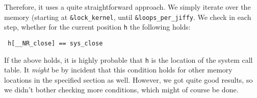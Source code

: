 \documentclass[10pt, letterpaper]{scrartcl}
\begin{document}
Therefore, it uses a quite straightforward approach. We simply iterate over the memory (starting at \texttt{\&lock\_kernel}, until \texttt{\&loops\_per\_jiffy}. We check in each step, whether for the current position \texttt{h} the following holds:

\begin{verbatim}
 h[__NR_close] == sys_close
\end{verbatim}

If the above holds, it is highly probable that \texttt{h} is the location of the system call table. It \emph{might} be by incident that this condition holds for other memory locations in the specified section as well. However, we got quite good results, so we didn't bother checking more conditions, which might of course be done.
\end{document}
